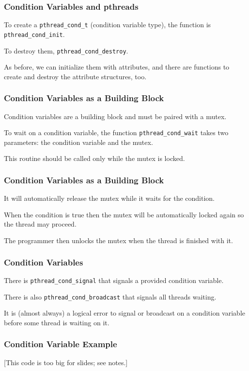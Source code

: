 \begin{frame}
\frametitle{Condition Variables and pthreads}

To create a \texttt{pthread\_cond\_t} (condition variable type), the function is \texttt{pthread\_cond\_init}.

To destroy them, \texttt{pthread\_cond\_destroy}. 

As before, we can initialize them with attributes, and there are functions to create and destroy the attribute structures, too. 

\end{frame}

\begin{frame}
\frametitle{Condition Variables as a Building Block}

Condition variables are a building block and must be paired with a mutex. 

To wait on a condition variable, the function \texttt{pthread\_cond\_wait} takes two parameters: the condition variable and the mutex. 

This routine should be called only while the mutex is locked.

\end{frame}

\begin{frame}
\frametitle{Condition Variables as a Building Block}

It will automatically release the mutex while it waits for the condition. 

When the condition is true then the mutex will be automatically locked again so the thread may proceed. 

The programmer then unlocks the mutex when the thread is finished with it. 

\end{frame}

\begin{frame}
\frametitle{Condition Variables}

There is \texttt{pthread\_cond\_signal} that signals a provided condition variable. 

There is also \texttt{pthread\_cond\_broadcast} that signals all threads waiting. 

It is (almost always) a logical error to signal or broadcast on a condition variable before some thread is waiting on it.

\end{frame}

\begin{frame}
\frametitle{Condition Variable Example}

[This code is too big for slides; see notes.]

\end{frame}

